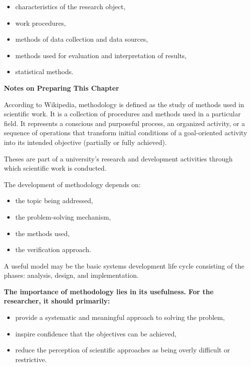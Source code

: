 \begin{itemize} 
	\item characteristics of the research object, 
	\item work procedures, 
	\item methods of data collection and data sources, 
	\item methods used for evaluation and interpretation of results, 
	\item statistical methods. 
\end{itemize} 

\textbf{Notes on Preparing This Chapter} 

According to Wikipedia, methodology is defined as the study of methods used in scientific work. It is a collection of procedures and methods used in a particular field. It represents a conscious and purposeful process, an organized activity, or a sequence of operations that transform initial conditions of a goal-oriented activity into its intended objective (partially or fully achieved).

Theses are part of a university's research and development activities through which scientific work is conducted. 

The development of methodology depends on: 

\begin{itemize} 
	\item the topic being addressed, 
	\item the problem-solving mechanism, 
	\item the methods used, 
	\item the verification approach. 
\end{itemize} 

A useful model may be the basic systems development life cycle consisting of the phases: analysis, design, and implementation. 

\textbf{The importance of methodology lies in its usefulness. For the researcher, it should primarily:} 

\begin{itemize} 
	\item provide a systematic and meaningful approach to solving the problem, 
	\item inspire confidence that the objectives can be achieved, 
	\item reduce the perception of scientific approaches as being overly difficult or restrictive. 
\end{itemize} 

